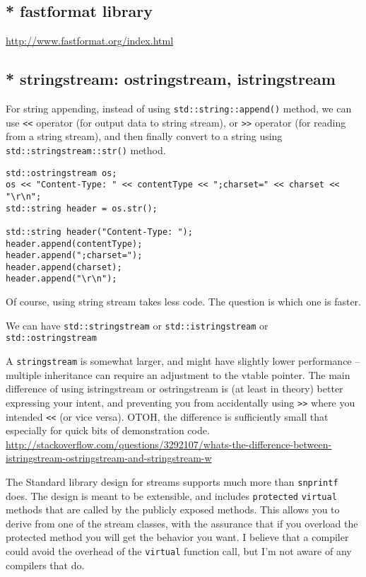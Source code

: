 \subsection{* fastformat library}
\label{sec:fastformat}

\url{http://www.fastformat.org/index.html}

\subsection{* stringstream: ostringstream, istringstream}
\label{sec:stringstream}
\label{sec:ostringstream}
\label{sec:istringstream}


For string appending, instead of using \verb!std::string::append()! method, we
can use \verb!<<! operator (for output data to string stream), or \verb!>>!
operator (for reading from a string stream), and then finally convert to a
string using \verb!std::stringstream::str()! method.

\begin{lstlisting}
std::ostringstream os;
os << "Content-Type: " << contentType << ";charset=" << charset << "\r\n";
std::string header = os.str();

std::string header("Content-Type: ");
header.append(contentType);
header.append(";charset=");
header.append(charset);
header.append("\r\n");
\end{lstlisting}
Of course, using string stream takes less code.
The question is which one is faster.


We can have \verb!std::stringstream! or 
\verb!std::istringstream! or \verb!std::ostringstream! 

A \verb!stringstream! is somewhat larger, and might have slightly lower
performance -- multiple inheritance can require an adjustment to the vtable
pointer. The main difference of using istringstream or ostringstream is (at
least in theory) better expressing your intent, and preventing you from
accidentally using \verb!>>! where you intended \verb!<<! (or vice versa). OTOH,
the difference is sufficiently small that especially for quick bits of
demonstration code.
\url{http://stackoverflow.com/questions/3292107/whats-the-difference-between-istringstream-ostringstream-and-stringstream-w}



The Standard library design for streams supports much more than \verb!snprintf!
does. The design is meant to be extensible, and includes \verb!protected!
\verb!virtual! methods that are called by the publicly exposed methods. This
allows you to derive from one of the stream classes, with the assurance that if
you overload the protected method you will get the behavior you want. I believe
that a compiler could avoid the overhead of the \verb!virtual! function call,
but I'm not aware of any compilers that do.

